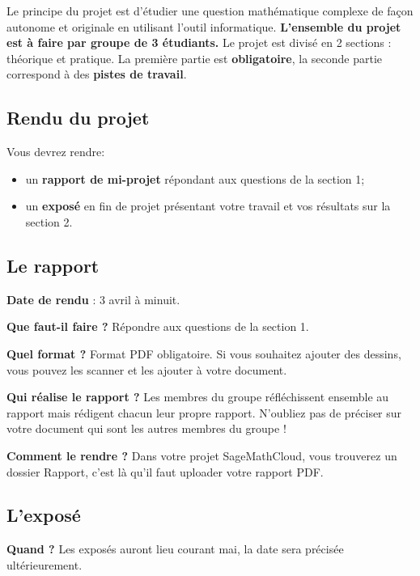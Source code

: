 Le principe du projet est d'étudier une question mathématique complexe de façon autonome et originale en utilisant l'outil informatique. \textbf{L'ensemble du projet est à faire par groupe de 3 étudiants.} Le projet est divisé en 2 sections : théorique et pratique. La première partie est \textbf{obligatoire}, la seconde partie correspond à des \textbf{pistes de travail}.

\subsection*{Rendu du projet}\strut

Vous devrez rendre:

\begin{itemize}

\item un \textbf{rapport de mi-projet} répondant aux questions de la section 1;

\item un \textbf{exposé} en fin de projet présentant votre travail et vos résultats sur la section 2.
\end{itemize}

\subsection*{Le rapport}\strut

\smallskip
\textbf{Date de rendu} : 3 avril à minuit.

\smallskip
\textbf{Que faut-il faire ?} Répondre aux questions de la section 1.

\smallskip
\textbf{Quel format ?} Format PDF obligatoire. Si vous souhaitez ajouter des dessins, vous pouvez les scanner et les ajouter à votre document.

\smallskip
\textbf{Qui réalise le rapport ?} Les membres du groupe réfléchissent ensemble au rapport mais rédigent chacun leur propre rapport. N'oubliez pas de préciser sur votre document qui sont les autres membres du groupe !

\smallskip
\textbf{Comment le rendre ?} Dans votre projet SageMathCloud, vous trouverez un dossier \og Rapport\fg, c'est là qu'il faut uploader votre rapport PDF.

\subsection*{L'exposé}\strut

\smallskip
\textbf{Quand ?} Les exposés auront lieu courant mai, la date sera précisée ultérieurement.

